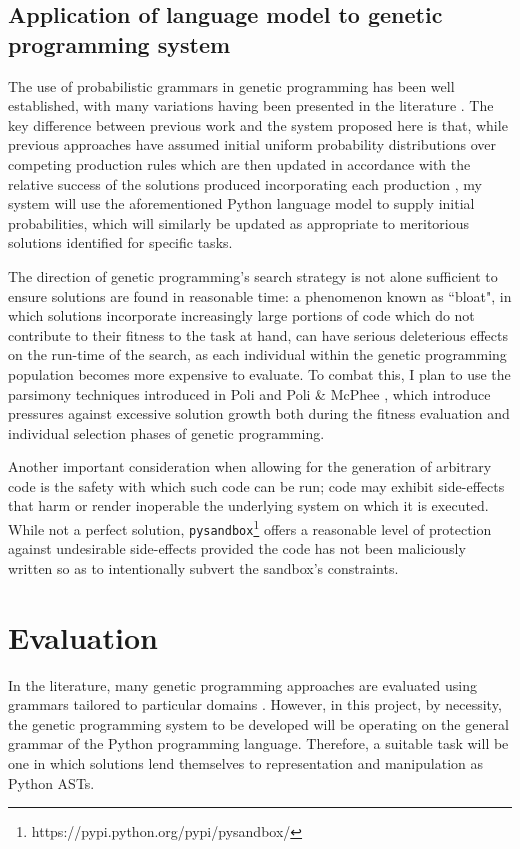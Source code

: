 \documentclass[a4paper,11pt]{proposal}
\begin{document}
\subsection{Application of language model to genetic programming system}

The use of probabilistic grammars in genetic programming has been well established, with many variations having been presented in the literature \cite{shan2006}. The key difference between previous work and the system proposed here is that, while previous approaches have assumed initial uniform probability distributions over competing production rules which are then updated in accordance with the relative success of the solutions produced incorporating each production \cite{whigham1995} \cite{ratle2001} \cite{keber2002}, my system will use the aforementioned Python language model to supply initial probabilities, which will similarly be updated as appropriate to meritorious solutions identified for specific tasks. 

The direction of genetic programming's search strategy is not alone sufficient to ensure solutions are found in reasonable time: a phenomenon known as ``bloat", in which solutions incorporate increasingly large portions of code which do not contribute to their fitness to the task at hand, can have serious deleterious effects on the run-time of the search, as each individual within the genetic programming population becomes more expensive to evaluate. To combat this, I plan to use the parsimony techniques introduced in Poli \cite{poli2003} and Poli \& McPhee \cite{poli2008}, which introduce pressures against excessive solution growth both during the fitness evaluation and individual selection phases of genetic programming.

Another important consideration when allowing for the generation of arbitrary code is the safety with which such code can be run; code may exhibit side-effects that harm or render inoperable the underlying system on which it is executed. While not a perfect solution, \texttt{pysandbox}\footnote{https://pypi.python.org/pypi/pysandbox/} offers a reasonable level of protection against undesirable side-effects provided the code has not been maliciously written so as to intentionally subvert the sandbox's constraints. 


\section{Evaluation}

In the literature, many genetic programming approaches are evaluated using grammars tailored to particular domains \cite{mcdermott2012}. However, in this project, by necessity, the genetic programming system to be developed will be operating on the general grammar of the Python programming language. Therefore, a suitable task will be one in which solutions lend themselves to representation and manipulation as Python ASTs.
\end{document}
